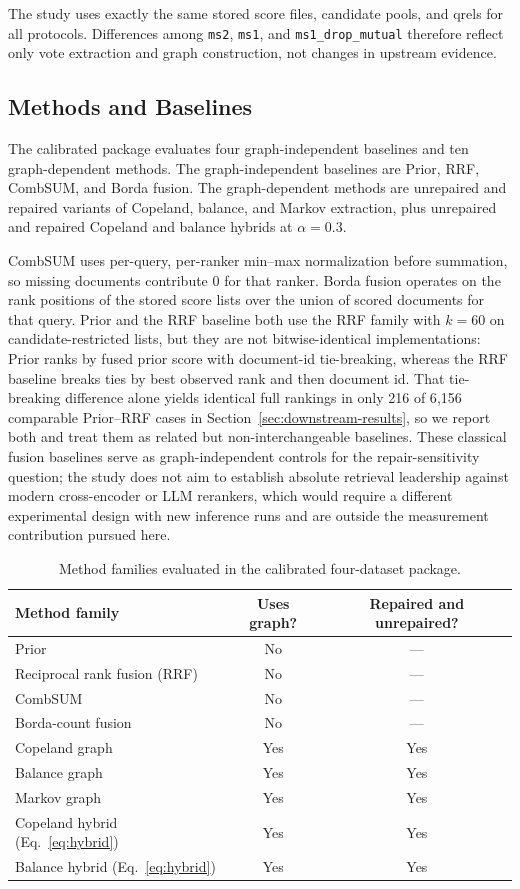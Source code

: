 \documentclass[manuscript,anonymous,review]{acmart}
\begin{document}
The study uses exactly the same stored score files, candidate pools, and qrels
for all protocols. Differences among \texttt{ms2}, \texttt{ms1}, and
\texttt{ms1\_drop\_mutual} therefore reflect only vote extraction and graph
construction, not changes in upstream evidence.

\subsection{Methods and Baselines}
\label{sec:baselines}

The calibrated package evaluates four graph-independent baselines and ten
graph-dependent methods. The graph-independent baselines are Prior, RRF,
CombSUM, and Borda fusion. The graph-dependent methods are unrepaired and
repaired variants of Copeland, balance, and Markov extraction, plus unrepaired
and repaired Copeland and balance hybrids at $\alpha=0.3$.

CombSUM uses per-query, per-ranker min--max normalization before summation, so
missing documents contribute $0$ for that ranker. Borda fusion operates on the
rank positions of the stored score lists over the union of scored documents for
that query. Prior and the RRF baseline both use the RRF family with $k=60$ on
candidate-restricted lists, but they are not bitwise-identical implementations:
Prior ranks by fused prior score with document-id tie-breaking, whereas the RRF
baseline breaks ties by best observed rank and then document id. That
tie-breaking difference alone yields identical full rankings in only 216 of
6{,}156 comparable Prior--RRF cases in Section~\ref{sec:downstream-results}, so
we report both and treat them as related but non-interchangeable baselines.
These classical fusion baselines serve as graph-independent controls for the
repair-sensitivity question; the study does not aim to establish
absolute retrieval leadership against modern cross-encoder or LLM rerankers,
which would require a different experimental design with new inference runs and
are outside the measurement contribution pursued here.

\begin{table}[t]
  \caption{Method families evaluated in the calibrated four-dataset package.}
  \label{tab:baselines}
  \begin{tabular}{lcc}
    \toprule
    Method family & Uses graph? & Repaired and unrepaired? \\
    \midrule
    Prior & No & --- \\
    Reciprocal rank fusion (RRF) & No & --- \\
    CombSUM & No & --- \\
    Borda-count fusion & No & --- \\
    Copeland graph & Yes & Yes \\
    Balance graph & Yes & Yes \\
    Markov graph & Yes & Yes \\
    Copeland hybrid (Eq.~\eqref{eq:hybrid}) & Yes & Yes \\
    Balance hybrid (Eq.~\eqref{eq:hybrid}) & Yes & Yes \\
    \bottomrule
  \end{tabular}
\end{table}
\end{document}
